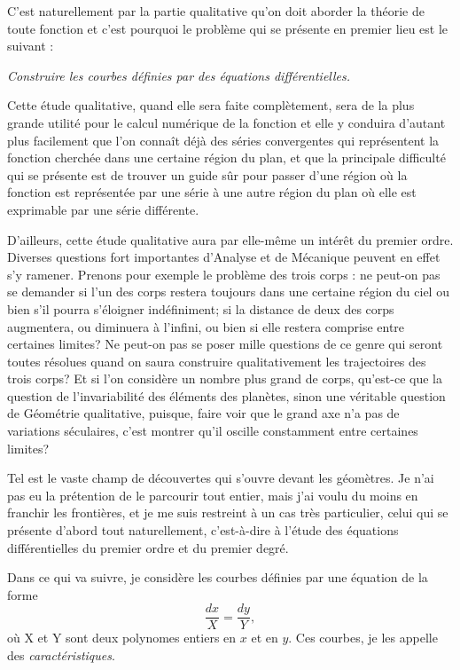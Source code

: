 \documentclass[11pt]{article}
\begin{document}
C’est naturellement par la partie qualitative qu’on doit aborder la théorie de toute fonction et c’est pourquoi le problème qui se présente en premier lieu est le suivant :

\begin{center}
\emph{Construire les courbes définies par des équations différentielles.}
\end{center}

Cette étude qualitative, quand elle sera faite complètement, sera de la plus grande utilité pour le calcul numérique de la fonction et elle y conduira d’autant plus facilement que l’on connaît déjà des séries convergentes qui représentent la fonction cherchée dans une certaine région du plan, et que la principale difficulté qui se présente est de trouver un guide sûr pour passer d’une région où la fonction est représentée par une série à une autre région du plan où elle est exprimable par une série différente.

D’ailleurs, cette étude qualitative aura par elle-même un intérêt du premier ordre. Diverses questions fort importantes d’Analyse et de Mécanique peuvent en effet s’y ramener. Prenons pour exemple le problème des trois corps : ne peut-on pas se demander si l’un des corps restera toujours dans une certaine région du ciel ou bien s’il pourra s’éloigner indéfiniment; si la distance de deux des corps augmentera, ou diminuera à l’infini, ou bien si elle restera comprise entre certaines limites? Ne peut-on pas se poser mille questions de ce genre qui seront toutes résolues quand on saura construire qualitativement les trajectoires des trois corps? Et si l’on considère un nombre plus grand de corps, qu’est-ce que la question de l’invariabilité des éléments des planètes, sinon une véritable question de Géométrie qualitative, puisque, faire voir que le grand axe n’a pas de variations séculaires, c’est montrer qu’il oscille constamment entre certaines limites?

Tel est le vaste champ de découvertes qui s’ouvre devant les géomètres. Je n’ai pas eu la prétention de le parcourir tout entier, mais j’ai voulu du moins en franchir les frontières, et je me suis restreint à un cas très particulier, celui qui se présente d’abord tout naturellement, c’est-à-dire à l’étude des équations différentielles du premier ordre et du premier degré.

Dans ce qui va suivre, je considère les courbes définies par une équation de la forme
\[
\frac{dx}{X}=\frac{dy}{Y},
\]
où X et Y sont deux polynomes entiers en $x$ et en $y$. Ces courbes, je les appelle des \emph{caractéristiques}.
\end{document}
